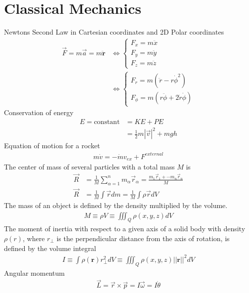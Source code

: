 \chapter{Classical Mechanics}
\thispagestyle{fancy}
\begin{multicols}{2}
Newtons Second Law in Cartesian coordinates and 2D Polar coordinates
\begin{align}
\vec{F}=m\vec{a} = m\boldsymbol{{\ddot{r}}} &\Longleftrightarrow \begin{cases}
F_x = m\ddot{x} \\ F_y = m\ddot{y} \\ F_z = m\ddot{z}
\end{cases}
\\&\Longleftrightarrow \begin{cases}
F_r=m(\ddot{r}-r\dot{\phi}^2) \\
F_\phi=m(r\ddot{\phi}+2\dot{r}\dot{\phi})
\end{cases}
\end{align}
Conservation of energy
\begin{align}
E =\textrm{constant} &=KE+PE \\ &=\frac{1}{2}m|\vec{v}|^2+mgh
\end{align}
Equation of motion for a rocket
\begin{align}
m\dot{v}=-\dot{m}v_{ex}+F^{external}
\end{align}
The center of mass of several particles with a total mass $M$ is
\begin{align}
\vec{R} &=\frac{1}{M}\sum_{\alpha=1}^{n}m_\alpha\vec{r}_\alpha = \frac{m_1\vec{r}_1+\cdots m_n\vec{r}_n}{M} \\
\vec{R} &= \frac{1}{M}\int \vec{r} dm = \frac{1}{M} \int \rho \vec{r} dV 
\end{align}
The mass of an object is defined by the density multiplied by the volume.
\begin{align}
M\equiv \rho V\equiv \iiint_Q\rho(x,y,z) dV
\end{align}
The moment of inertia with respect to a given axis of a solid body with density $\rho(r)$, where $r_\perp$ is the perpendicular distance from the axis of rotation, is defined by the volume integral
\begin{align}
I \equiv \int \rho(\boldsymbol{r}) r_\perp^2 dV \equiv \iiint_{Q}\rho(x,y,z)||\boldsymbol{r}||^2dV 
\end{align}
Angular momentum
\begin{align}
\vec{L}=\vec{r}\times \vec{p}=I\vec{\omega}=I\dot{\theta}
\end{align}

\end{multicols}
